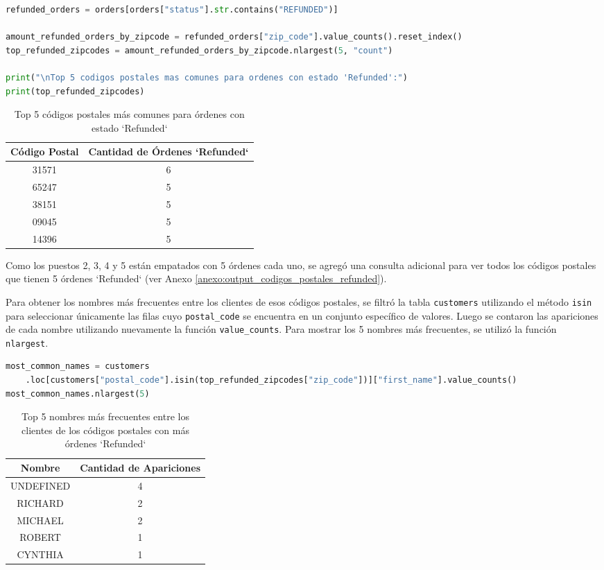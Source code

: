 \begin{lstlisting}[language=Python, xleftmargin=35pt, xrightmargin=35pt]
refunded_orders = orders[orders["status"].str.contains("REFUNDED")]

amount_refunded_orders_by_zipcode = refunded_orders["zip_code"].value_counts().reset_index()
top_refunded_zipcodes = amount_refunded_orders_by_zipcode.nlargest(5, "count")

print("\nTop 5 codigos postales mas comunes para ordenes con estado 'Refunded':")
print(top_refunded_zipcodes)
\end{lstlisting}
\begin{table}[H]
\centering
\begin{tabular}{|c|c|}
\hline
\textbf{Código Postal} & \textbf{Cantidad de Órdenes `Refunded`} \\
\hline
31571 & 6 \\
65247 & 5 \\
38151 & 5 \\
09045 & 5 \\
14396 & 5 \\
\hline
\end{tabular}
\caption{Top 5 códigos postales más comunes para órdenes con estado `Refunded`}
\end{table}
Como los puestos 2, 3, 4 y 5 están empatados con 5 órdenes cada uno, se agregó una consulta adicional para ver todos los códigos postales que tienen 5 órdenes `Refunded` (ver Anexo \ref{anexo:output_codigos_postales_refunded}).

Para obtener los nombres más frecuentes entre los clientes de esos códigos postales, se filtró la tabla \texttt{customers} utilizando el método \texttt{isin} para seleccionar únicamente las filas cuyo \texttt{postal\_code} se encuentra en un conjunto específico de valores. Luego se contaron las apariciones de cada nombre utilizando nuevamente la función \texttt{value\_counts}. Para mostrar los 5 nombres más frecuentes, se utilizó la función \texttt{nlargest}.

\begin{lstlisting}[language=Python, xleftmargin=20pt, xrightmargin=20pt]
most_common_names = customers
    .loc[customers["postal_code"].isin(top_refunded_zipcodes["zip_code"])]["first_name"].value_counts()
most_common_names.nlargest(5)
\end{lstlisting}
\begin{table}[H]
\centering
\begin{tabular}{|c|c|}
\hline
\textbf{Nombre} & \textbf{Cantidad de Apariciones} \\
\hline
UNDEFINED & 4 \\
RICHARD & 2 \\
MICHAEL & 2 \\
ROBERT & 1 \\
CYNTHIA & 1 \\
\hline
\end{tabular}
\caption{Top 5 nombres más frecuentes entre los clientes de los códigos postales con más órdenes `Refunded`}
\end{table}

